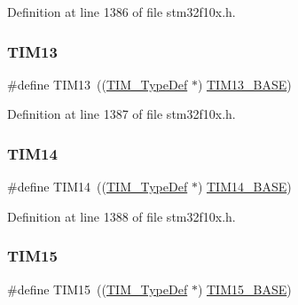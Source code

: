 Definition at line 1386 of file stm32f10x.\+h.

\mbox{\label{group___peripheral__declaration_ga5a959a833074d59bf6cc7fb437c65b18}} 
\subsubsection{\texorpdfstring{T\+I\+M13}{TIM13}}
{\footnotesize\ttfamily \#define T\+I\+M13~((\hyperlink{struct_t_i_m___type_def}{T\+I\+M\+\_\+\+Type\+Def} $\ast$) \hyperlink{group___peripheral__memory__map_gad20f79948e9359125a40bbf6ed063590}{T\+I\+M13\+\_\+\+B\+A\+SE})}



Definition at line 1387 of file stm32f10x.\+h.

\mbox{\label{group___peripheral__declaration_ga2dd30f46fad69dd73e1d8941a43daffe}} 
\subsubsection{\texorpdfstring{T\+I\+M14}{TIM14}}
{\footnotesize\ttfamily \#define T\+I\+M14~((\hyperlink{struct_t_i_m___type_def}{T\+I\+M\+\_\+\+Type\+Def} $\ast$) \hyperlink{group___peripheral__memory__map_ga862855347d6e1d92730dfe17ee8e90b8}{T\+I\+M14\+\_\+\+B\+A\+SE})}



Definition at line 1388 of file stm32f10x.\+h.

\mbox{\label{group___peripheral__declaration_ga87e4b442041d1c03a6af113fbe04a182}} 
\subsubsection{\texorpdfstring{T\+I\+M15}{TIM15}}
{\footnotesize\ttfamily \#define T\+I\+M15~((\hyperlink{struct_t_i_m___type_def}{T\+I\+M\+\_\+\+Type\+Def} $\ast$) \hyperlink{group___peripheral__memory__map_ga7ab42ce1846930569d742d339b554078}{T\+I\+M15\+\_\+\+B\+A\+SE})}




